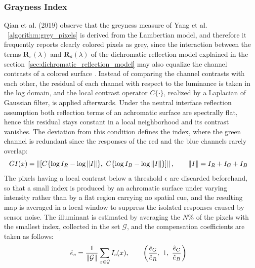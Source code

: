 \subsubsection{Grayness Index}
\label{algorithm:grayness_index}
Qian et al. (2019) observe that the greyness measure of Yang et al. ~\ref{algorithm:grey_pixels} is derived from the Lambertian model, and therefore it frequently reports clearly colored pixels as grey, since the interaction between the terms $\mathbf{R}_s(\lambda)$ and $\mathbf{R}_d(\lambda)$ of the dichromatic reflection model explained in the section~\ref{sec:dichromatic_reflection_model} may also equalize the channel contrasts of a colored surface \cite{qianFindingGrayPixels}. Instead of comparing the channel contrasts with each other, the residual of each channel with respect to the luminance is taken in the log domain, and the local contrast operator $C\{\cdot\}$, realized by a Laplacian of Gaussian filter, is applied afterwards. Under the neutral interface reflection assumption both reflection terms of an achromatic surface are spectrally flat, hence this residual stays constant in a local neighborhood and its contrast vanishes. The deviation from this condition defines the index, where the green channel is redundant since the responses of the red and the blue channels rarely overlap:
\begin{equation}
GI(x) = \left\lVert\left[ C\{\log I_R - \log \left\lVert I\right\rVert\}, \,\, C\{\log I_B - \log \left\lVert I\right\rVert\} \right]\right\rVert, \qquad \left\lVert I\right\rVert = I_R + I_G + I_B
\end{equation}
The pixels having a local contrast below a threshold $\epsilon$ are discarded beforehand, so that a small index is produced by an achromatic surface under varying intensity rather than by a flat region carrying no spatial cue, and the resulting map is averaged in a local window to suppress the isolated responses caused by sensor noise. The illuminant is estimated by averaging the $N\%$ of the pixels with the smallest index, collected in the set $\mathcal{G}$, and the compensation coefficients are taken as follows:
\begin{equation}
\hat{e}_c = \frac{1}{\left\lVert\mathcal{G}\right\rVert} \sum_{x \in \mathcal{G}} I_c(x), \qquad \left( \frac{\hat{e}_G}{\hat{e}_R}, \,\, 1, \,\, \frac{\hat{e}_G}{\hat{e}_B} \right)
\end{equation}

